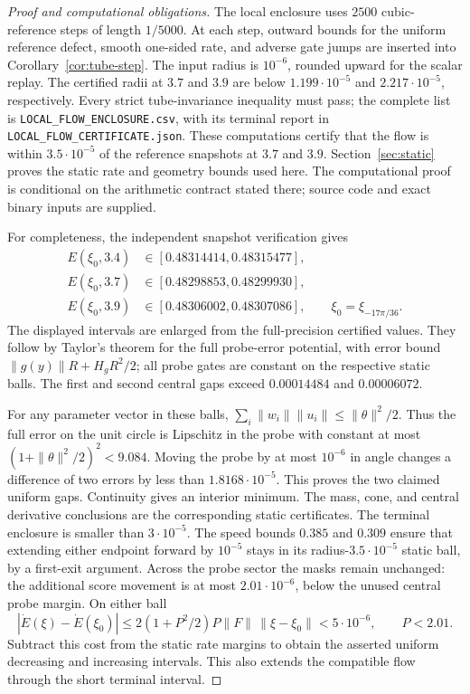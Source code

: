\begin{proof}[Proof and computational obligations]
The local enclosure uses $2500$ cubic-reference steps of length $1/5000$.
At each step, outward bounds for the uniform reference defect, smooth
one-sided rate, and adverse gate jumps are inserted into
Corollary~\ref{cor:tube-step}. The input radius is $10^{-6}$, rounded upward for the scalar replay.
The certified radii at $3.7$ and $3.9$ are below
$1.199\cdot10^{-5}$ and $2.217\cdot10^{-5}$, respectively.
Every strict tube-invariance inequality must pass; the complete list is
\texttt{LOCAL\_FLOW\_ENCLOSURE.csv}, with its terminal report in
\texttt{LOCAL\_FLOW\_CERTIFICATE.json}. These computations certify that
the flow is within $3.5\cdot10^{-5}$ of the reference snapshots at $3.7$
and $3.9$. Section~\ref{sec:static} proves the static rate and geometry
bounds used here. The computational proof is conditional on the arithmetic
contract stated there; source code and exact binary inputs are supplied.

For completeness, the independent snapshot verification gives
\begin{align*}
 E(\xi_0,3.4)&\in[0.48314414,0.48315477],\\
 E(\xi_0,3.7)&\in[0.48298853,0.48299930],\\
 E(\xi_0,3.9)&\in[0.48306002,0.48307086],
 \qquad \xi_0=\xi_{-17\pi/36}.
\end{align*}
The displayed intervals are enlarged from the full-precision certified
values. They follow by Taylor's theorem for the full probe-error potential,
with error bound $\|g(y)\|R+H_gR^2/2$; all probe gates are constant
on the respective static balls. The first and second central gaps exceed
$0.00014484$ and $0.00006072$.

For any parameter vector in these balls,
$\sum_i\|w_i\|\|u_i\|\le\|\theta\|^2/2$.
Thus the full error on the unit circle is Lipschitz in the probe with
constant at most $(1+\|\theta\|^2/2)^2<9.084$.
Moving the probe by at most $10^{-6}$ in angle changes a difference of
two errors by less than $1.8168\cdot10^{-5}$. This proves the two
claimed uniform gaps. Continuity gives an interior minimum. The mass,
cone, and central derivative conclusions are the corresponding static
certificates. The terminal enclosure is smaller than $3\cdot10^{-5}$.
The speed bounds $0.385$ and $0.309$ ensure that extending either
endpoint forward by $10^{-5}$ stays in its radius-$3.5\cdot10^{-5}$
static ball, by a first-exit argument. Across the probe sector the masks
remain unchanged: the additional score movement is at most
$2.01\cdot10^{-6}$, below the unused central probe margin. On either ball
\[
 |\dot E(\xi)-\dot E(\xi_0)|
 \le2(1+P^2/2)P\|F\|\,\|\xi-\xi_0\|
 <5\cdot10^{-6},\qquad P<2.01.
\]
Subtract this cost from the static rate margins to obtain the asserted
uniform decreasing and increasing intervals. This also extends the
compatible flow through the short terminal interval.
\end{proof}

